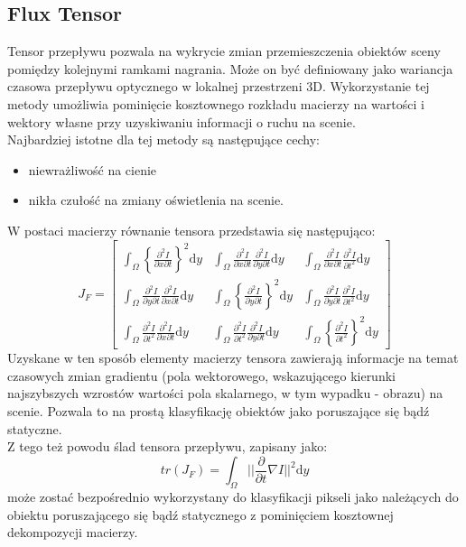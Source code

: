 \subsection{Flux Tensor}
\label{sec:FT}
Tensor przepływu pozwala na wykrycie zmian przemieszczenia obiektów sceny pomiędzy kolejnymi ramkami nagrania. Może on być definiowany jako wariancja czasowa przepływu optycznego w lokalnej przestrzeni 3D. Wykorzystanie tej metody umożliwia pominięcie kosztownego rozkładu macierzy na wartości i wektory własne przy uzyskiwaniu informacji o ruchu na scenie.\\
Najbardziej istotne dla tej metody są następujące cechy:
\begin{itemize}
\item niewrażliwość na cienie
\item nikła czułość na zmiany oświetlenia na scenie.
\end{itemize} 
W postaci macierzy równanie tensora przedstawia się następująco:
\begin{equation}
\label{eq:FT}
J_{F} =
\begin{bmatrix}
%
\int_\Omega \left\{\frac{\partial^2I}{\partial x\partial t}\right\}^2 \mathrm{d}y   &
%
\int_\Omega \frac{\partial^2I}{\partial x\partial t} \frac{\partial^2I}{\partial y\partial t} \mathrm{d}y  &
%
\int_\Omega \frac{\partial^2I}{\partial x\partial t} \frac{\partial^2I}{\partial t^2} \mathrm{d}y
\\[0.5em]
%
%
\int_\Omega \frac{\partial^2I}{\partial y\partial t} \frac{\partial^2I}{\partial x\partial t} \mathrm{d}y  &
%
\int_\Omega \left\{\frac{\partial^2I}{\partial y\partial t}\right\}^2 \mathrm{d}y   &
%
\int_\Omega \frac{\partial^2I}{\partial y\partial t} \frac{\partial^2I}{\partial t^2} \mathrm{d}y
\\[0.5em]
%
%
\int_\Omega \frac{\partial^2I}{\partial t^2} \frac{\partial^2I}{\partial x\partial t} \mathrm{d}y   &
%
\int_\Omega \frac{\partial^2I}{\partial t^2} \frac{\partial^2I}{\partial y\partial t} \mathrm{d}y   &
%
\int_\Omega \left\{\frac{\partial^2I}{\partial t^2}\right\}^2 \mathrm{d}y
\end{bmatrix}
\end{equation}
Uzyskane w ten sposób elementy macierzy tensora zawierają informacje na temat czasowych zmian gradientu (pola wektorowego, wskazującego kierunki najszybszych wzrostów wartości pola skalarnego, w tym wypadku - obrazu) na scenie. Pozwala to na prostą klasyfikację obiektów jako poruszające się bądź statyczne.\\
Z tego też powodu ślad tensora przepływu, zapisany jako:
\begin{equation}
tr(J_{F}) = 
\int_\Omega ||\frac{\partial}{\partial t}\nabla I||^2\mathrm{d}y
\end{equation}
może zostać bezpośrednio wykorzystany do klasyfikacji pikseli jako należących do obiektu poruszającego się bądź statycznego z pominięciem kosztownej dekompozycji macierzy.

